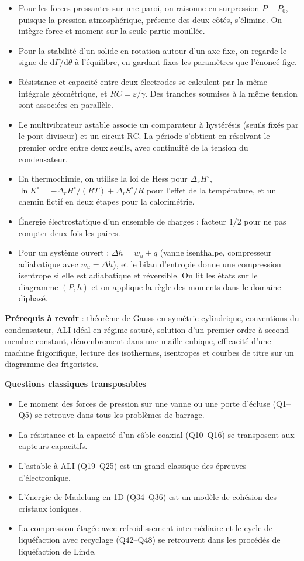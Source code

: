 \documentclass[11pt,a4paper]{article}
\providecommand{\tightlist}{\setlength{\itemsep}{0pt}\setlength{\parskip}{0pt}}
\begin{document}
\begin{itemize}
\tightlist
\item
  Pour les forces pressantes sur une paroi, on raisonne en surpression \(P-P_0\), puisque la pression atmosphérique, présente des deux côtés, s'élimine. On intègre force et moment sur la seule partie mouillée.
\item
  Pour la stabilité d'un solide en rotation autour d'un axe fixe, on regarde le signe de \(\mathrm d\Gamma/\mathrm d\theta\) à l'équilibre, en gardant fixes les paramètres que l'énoncé fige.
\item
  Résistance et capacité entre deux électrodes se calculent par la même intégrale géométrique, et \(RC=\varepsilon/\gamma\). Des tranches soumises à la même tension sont associées en parallèle.
\item
  Le multivibrateur astable associe un comparateur à hystérésis (seuils fixés par le pont diviseur) et un circuit RC. La période s'obtient en résolvant le premier ordre entre deux seuils, avec continuité de la tension du condensateur.
\item
  En thermochimie, on utilise la loi de Hess pour \(\Delta_rH^\circ\), \(\ln K^\circ=-\Delta_rH^\circ/(RT)+\Delta_rS^\circ/R\) pour l'effet de la température, et un chemin fictif en deux étapes pour la calorimétrie.
\item
  Énergie électrostatique d'un ensemble de charges : facteur 1/2 pour ne pas compter deux fois les paires.
\item
  Pour un système ouvert : \(\Delta h=w_u+q\) (vanne isenthalpe, compresseur adiabatique avec \(w_u=\Delta h\)), et le bilan d'entropie donne une compression isentrope si elle est adiabatique et réversible. On lit les états sur le diagramme \((P,h)\) et on applique la règle des moments dans le domaine diphasé.
\end{itemize}

\textbf{Prérequis à revoir} : théorème de Gauss en symétrie cylindrique, conventions du condensateur, ALI idéal en régime saturé, solution d'un premier ordre à second membre constant, dénombrement dans une maille cubique, efficacité d'une machine frigorifique, lecture des isothermes, isentropes et courbes de titre sur un diagramme des frigoristes.

\textbf{Questions classiques transposables}

\begin{itemize}
\tightlist
\item
  Le moment des forces de pression sur une vanne ou une porte d'écluse (Q1--Q5) se retrouve dans tous les problèmes de barrage.
\item
  La résistance et la capacité d'un câble coaxial (Q10--Q16) se transposent aux capteurs capacitifs.
\item
  L'astable à ALI (Q19--Q25) est un grand classique des épreuves d'électronique.
\item
  L'énergie de Madelung en 1D (Q34--Q36) est un modèle de cohésion des cristaux ioniques.
\item
  La compression étagée avec refroidissement intermédiaire et le cycle de liquéfaction avec recyclage (Q42--Q48) se retrouvent dans les procédés de liquéfaction de Linde.
\end{itemize}
\end{document}
